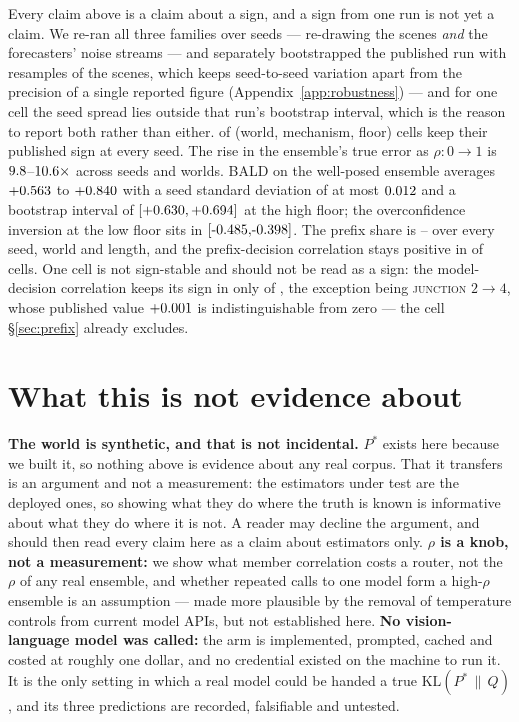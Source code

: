 \documentclass[10pt]{article}
\newcommand{\Pstar}{P^{*}}
\newcommand{\KL}[2]{\mathrm{KL}(#1\,\|\,#2)}
\begin{document}
Every claim above is a claim about a sign, and a sign from one run is not yet a claim. We re-ran
all three families over \RobSeeds{} seeds --- re-drawing the scenes \emph{and} the forecasters'
noise streams --- and separately bootstrapped the published run with \RobBoot{} resamples of the
scenes, which keeps seed-to-seed variation apart from the precision of a single reported figure
(Appendix~\ref{app:robustness}) --- and for one cell the seed spread lies outside that run's
bootstrap interval, which is the reason to report both rather than either.
\RobMechStable{} of \RobMechCells{} (world, mechanism, floor) cells keep their published sign at
every seed. The rise in the ensemble's true error as
$\rho: 0 \to 1$ is $9.8$--$10.6\times$ across seeds and worlds. BALD on the well-posed
ensemble averages $+0.563$ to $+0.840$ with a seed standard deviation of at most
$0.012$ and a bootstrap interval of $[+0.630, +0.694]$ at the high floor; the overconfidence
inversion at the low floor sits in $\RobOverLoCI$. The prefix share is
\RobPreShareLo--\RobPreShareHi{} over every seed, world and length, and the prefix-decision
correlation stays positive in \RobPrePositive{} of \RobPreCells{} cells. One cell is not
sign-stable and should not be read as a sign: the model-decision correlation keeps its sign in only
\RobPreModel{} of \RobPreCells{}, the exception being \textsc{junction} $2\to4$, whose published
value $+0.001$ is indistinguishable from zero --- the cell \S\ref{sec:prefix} already
excludes.

\section{What this is not evidence about}
\label{sec:limits}

\textbf{The world is synthetic, and that is not incidental.} $\Pstar$ exists here because we built
it, so nothing above is evidence about any real corpus. That it transfers is an argument and not a
measurement: the estimators under test are the deployed ones, so showing what they do where the
truth is known is informative about what they do where it is not. A reader may decline the
argument, and should then read every claim here as a claim about estimators only.
\textbf{$\rho$ is a knob, not a measurement:} we show what member correlation costs a router, not
the $\rho$ of any real ensemble, and whether repeated calls to one model form a high-$\rho$
ensemble is an assumption --- made more plausible by the removal of temperature controls from
current model APIs, but not established here. \textbf{No vision-language model was called:} the arm
is implemented, prompted, cached and costed at roughly one dollar, and no credential existed on
the machine to run it. It is the only setting in which a real model could be handed a true
$\KL{\Pstar}{Q}$, and its three predictions are recorded, falsifiable and untested.
\end{document}
